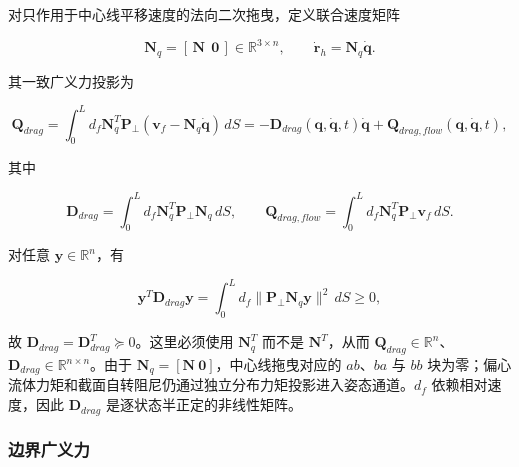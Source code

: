 对只作用于中心线平移速度的法向二次拖曳，定义联合速度矩阵

\begin{equation}
\label{eq:galerkin-2-73}
\boxed{\mathbf{N}_{q} = \left\lbrack \,\mathbf{N}\ \ \mathbf{0}\, \right\rbrack \in \mathbb{R}^{3 \times n},\quad\quad{\dot{\mathbf{r}}}_{h} = \mathbf{N}_{q}\dot{\mathbf{q}}.}
\end{equation}

其一致广义力投影为

\begin{equation}
\label{eq:galerkin-2-74}
\mathbf{Q}_{drag} = \int_{0}^{L}d_{f}\mathbf{N}_{q}^{T}\mathbf{P}_{\bot}\left( \mathbf{v}_{f} - \mathbf{N}_{q}\dot{\mathbf{q}} \right)\, dS = - \mathbf{D}_{drag}\left( \mathbf{q},\dot{\mathbf{q}},t \right)\dot{\mathbf{q}} + \mathbf{Q}_{drag,flow}\left( \mathbf{q},\dot{\mathbf{q}},t \right),
\end{equation}

其中

\begin{equation}
\label{eq:galerkin-2-75}
\boxed{\mathbf{D}_{drag} = \int_{0}^{L}d_{f}\mathbf{N}_{q}^{T}\mathbf{P}_{\bot}\mathbf{N}_{q}\, dS,\quad\quad\mathbf{Q}_{drag,flow} = \int_{0}^{L}d_{f}\mathbf{N}_{q}^{T}\mathbf{P}_{\bot}\mathbf{v}_{f}\, dS.}
\end{equation}

对任意 \(\mathbf{y} \in \mathbb{R}^{n}\)，有

\begin{equation}
\label{eq:galerkin-2-76}
\mathbf{y}^{T}\mathbf{D}_{drag}\mathbf{y} = \int_{0}^{L}d_{f} \parallel \mathbf{P}_{\bot}\mathbf{N}_{q}\mathbf{y} \parallel^{2}\, dS \geq 0,
\end{equation}

故 \(\mathbf{D}_{drag} = \mathbf{D}_{drag}^{T} \succcurlyeq 0\)。这里必须使用 \(\mathbf{N}_{q}^{T}\) 而不是 \(\mathbf{N}^{T}\)，从而 \(\mathbf{Q}_{drag} \in \mathbb{R}^{n}\)、\(\mathbf{D}_{drag} \in \mathbb{R}^{n \times n}\)。由于 \(\mathbf{N}_{q} = \left\lbrack \mathbf{N}\ \mathbf{0} \right\rbrack\)，中心线拖曳对应的 \(ab\)、\(ba\) 与 \(bb\) 块为零；偏心流体力矩和截面自转阻尼仍通过独立分布力矩投影进入姿态通道。\(d_{f}\) 依赖相对速度，因此 \(\mathbf{D}_{drag}\) 是逐状态半正定的非线性矩阵。

\subsubsection{边界广义力}\label{sec:galerkin-2-5-4}

